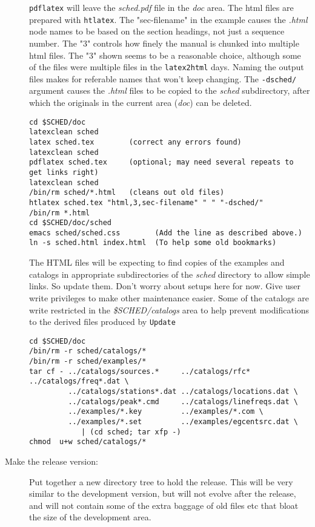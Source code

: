\documentclass{report}
\begin{document}
\begin{description}
{\tt pdflatex} will leave the {\sl sched.pdf} file in the {\sl doc}
area.  The html files are prepared with {\tt htlatex}.  The
"sec-filename" in the example causes the {\sl .html} node names to be
based on the section headings, not just a sequence number.  The "3"
controls how finely the manual is chunked into multiple html files.
The "3" shown seems to be a reasonable choice, although some of the
files were multiple files in the {\tt latex2html} days.  Naming the
output files makes for referable names that won't keep changing.  The
{\tt -dsched/} argument causes the {\sl .html} files to be copied to
the {\sl sched} subdirectory, after which the originals in the current
area ({\sl doc}) can be deleted.
     
\begin{verbatim}
cd $SCHED/doc
latexclean sched
latex sched.tex        (correct any errors found)
latexclean sched
pdflatex sched.tex     (optional; may need several repeats to get links right)
latexclean sched
/bin/rm sched/*.html   (cleans out old files)
htlatex sched.tex "html,3,sec-filename" " " "-dsched/"
/bin/rm *.html
cd $SCHED/doc/sched
emacs sched/sched.css        (Add the line as described above.)
ln -s sched.html index.html  (To help some old bookmarks)
\end{verbatim}

The HTML files will be expecting to find copies of the examples and
catalogs in appropriate subdirectories of the {\sl sched} directory to
allow simple links.  So update them.  Don't worry about setups here
for now.  Give user write privileges to make other maintenance easier.
Some of the catalogs are write restricted in the {\sl
\$SCHED/catalogs} area to help prevent modifications to the derived
files produced by {\tt Update}

\begin{verbatim}
cd $SCHED/doc
/bin/rm -r sched/catalogs/*
/bin/rm -r sched/examples/*
tar cf - ../catalogs/sources.*     ../catalogs/rfc*  ../catalogs/freq*.dat \
         ../catalogs/stations*.dat ../catalogs/locations.dat \
         ../catalogs/peak*.cmd     ../catalogs/linefreqs.dat \
         ../examples/*.key         ../examples/*.com \
         ../examples/*.set         ../examples/egcentsrc.dat \
            | (cd sched; tar xfp -)
chmod  u+w sched/catalogs/*
\end{verbatim}


\item [Make the release version:]

Put together a new directory tree to hold the release.  This will be
very similar to the development version, but will not evolve after the
release, and will not contain some of the extra baggage of old files
etc that bloat the size of the development area.


\end{description}
\end{document}
